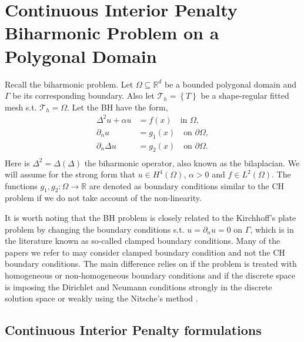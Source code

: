 
\newpage
\section{Continuous Interior Penalty Biharmonic Problem on a Polygonal Domain}%
\label{sec:CIP_biharmonic_problem}

Recall the biharmonic problem.
Let $\Omega \subseteq    \mathbb{R} ^d$ be a bounded polygonal domain and $\Gamma $ be its corresponding boundary. Also let $\mathcal{T}_{h} = \left\{ T \right\} $ be a shape-regular fitted mesh s.t. $\mathcal{T}_{h} = \Omega $. Let the BH have the form,
\begin{equation}
\label{eq:bi_problem}
\begin{split}
    \Delta^2  u  + \alpha  u  & = f( x)  \quad \text{in } \Omega,   \\
    \partial _{n} u & = g_{1}(x)   \quad \text{on } \partial \Omega,  \\
    \partial _{n} \Delta  u & = g_{2}( x)   \quad \text{on } \partial \Omega .  \\
\end{split}
\end{equation}
Here is $\Delta ^2 = \Delta  \left( \Delta  \right) $ the biharmonic operator, also known as the bilaplacian. We will assume for the strong form that $u \in H^{4}\left( \Omega  \right) $, $\alpha  >0 $ and $f \in L^{2}\left( \Omega  \right)
$. The functions $g_{1},g_{2}: \Omega  \to \mathbb{R}$ are denoted as boundary conditions similar to the CH problem if we do not take account of the non-linearity.

\begin{remark}
It is worth noting that the BH problem is closely related to the Kirchhoff's plate problem by changing the boundary conditions s.t. $u = \partial _{n } u = 0$ on $\Gamma $, which is in the literature known as so-called clamped boundary conditions.
Many of the papers we refer to may consider clamped boundary condition and not the CH boundary conditions. The main difference relies on if the problem is treated with homogeneous or non-homogeneous boundary conditions and if the discrete space is
imposing the Dirichlet and Neumann conditions strongly in the discrete solution space or weakly using the Nitsche's method \cite{nitsche1971variationsprinzip}.
\end{remark}



\subsection{Continuous Interior Penalty formulations}%
\label{sub:continuous_interior_penalty_formulations}

